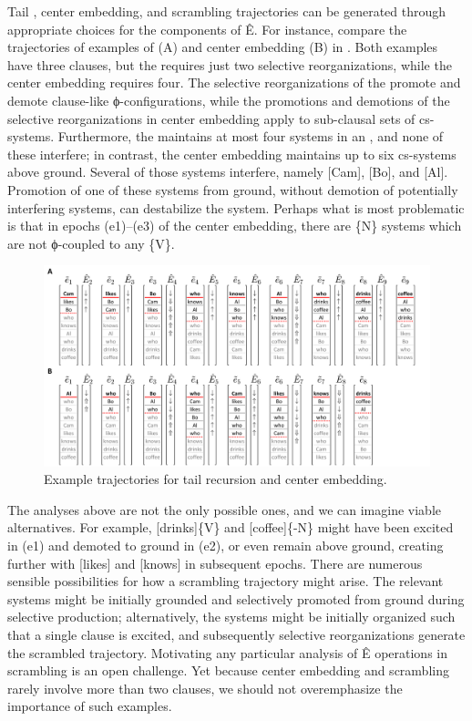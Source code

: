   Tail , center embedding, and scrambling trajectories can be generated through appropriate choices for the components of Ê. For instance, compare the trajectories of examples of  (A) and center embedding (B) in {}. Both examples have three clauses, but the  requires just two selective reorganizations, while the center embedding requires four. The selective reorganizations of the  promote and demote clause-like ϕ-con\-fig\-u\-ra\-tions, while the promotions and demotions of the selective reorganizations in center embedding apply to sub-clausal sets of cs-sys\-tems. Furthermore, the  maintains at most four systems in an , and none of these interfere; in contrast, the center embedding maintains up to six cs-sys\-tems above ground. Several of those systems interfere, namely [Cam], [Bo], and [Al]. Promotion of one of these systems from ground, without demotion of potentially interfering systems, can destabilize the system. Perhaps what is most problematic is that in epochs (e1)--(e3) of the center embedding, there are \{N\} systems which are not ϕ-coupled to any \{V\}.

  
\begin{figure}
\includegraphics[width=\textwidth]{figures/Tilsen-img119.png}
\caption{Example trajectories for tail recursion and center embedding.}
\label{fig:5:15}
\end{figure}
 
   The analyses above are not the only possible ones, and we can imagine viable alternatives. For example, [drinks]\{V\} and [coffee]\{-N\} might have been excited in (e1) and demoted to ground in (e2), or even remain above ground, creating further  with [likes] and [knows] in subsequent epochs. There are numerous sensible possibilities for how a scrambling trajectory might arise. The relevant systems might be initially grounded and selectively promoted from ground during selective production; alternatively, the systems might be initially organized such that a single clause is excited, and subsequently selective reorganizations generate the scrambled trajectory. Motivating any particular analysis of Ê operations in scrambling is an open challenge. Yet because center embedding and scrambling rarely involve more than two clauses, we should not overemphasize the importance of such examples.

